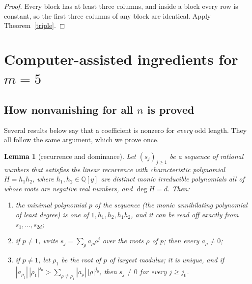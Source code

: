 \documentclass[11pt]{article}
\theoremstyle{plain}
\newtheorem{lemma}[theorem]{Lemma}
\theoremstyle{definition}
\theoremstyle{remark}
\newcommand{\Q}{\mathbb{Q}}
\begin{document}
\begin{proof}
Every block has at least three columns, and inside a block every row is constant, so the first three columns of
any block are identical. Apply Theorem~\ref{triple}.
\end{proof}

\section{Computer-assisted ingredients for $m = 5$}\label{sec:comp}

\subsection{How nonvanishing for all $n$ is proved}

Several results below say that a coefficient is nonzero for \emph{every} odd length. They all follow the same
argument, which we prove once.

\begin{lemma}[recurrence and dominance]\label{domroot}
Let $(s_j)_{j \ge 1}$ be a sequence of rational numbers that satisfies the linear recurrence with characteristic
polynomial $H = h_1 h_2$, where $h_1, h_2 \in \Q[y]$ are distinct monic irreducible polynomials all of whose roots are
negative real numbers, and $\deg H = d$. Then:
\begin{enumerate}[label=(\alph*),nosep]
\item the minimal polynomial $p$ of the sequence (the monic annihilating polynomial of least degree) is one of $1, h_1,
h_2, h_1 h_2$, and it can be read off exactly from $s_1, \dots, s_{2d}$;
\item if $p \ne 1$, write $s_j = \sum_{\rho} a_\rho \rho^j$ over the roots $\rho$ of $p$; then every $a_\rho \ne 0$;
\item if $p \ne 1$, let $\rho_1$ be the root of $p$ of largest modulus; it is unique, and if
$|a_{\rho_1}|\,|\rho_1|^{j_0} > \sum_{\rho \ne \rho_1} |a_\rho|\,|\rho|^{j_0}$, then $s_j \ne 0$ for every $j \ge j_0$.
\end{enumerate}
\end{lemma}
\end{document}
